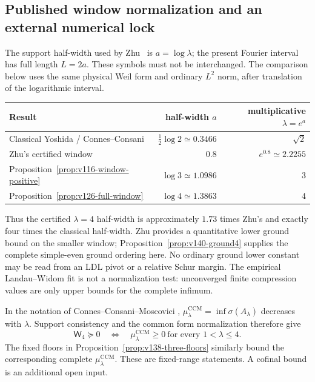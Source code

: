 \subsection*{Published window normalization and an external numerical lock}

The support half-width used by Zhu~\cite{Zhu2026Windows} is
$a=\log\lambda$; the present Fourier interval has full length
$L=2a$. These symbols must not be interchanged. The comparison below
uses the same physical Weil form and ordinary $L^2$ norm, after
translation of the logarithmic interval.
\begin{center}
\begin{tabular}{lrr}
\toprule
Result & half-width $a$ & multiplicative $\lambda=e^a$\\
\midrule
Classical Yoshida / Connes--Consani & $\tfrac12\log2\simeq0.3466$ & $\sqrt2$\\
Zhu's certified window & $0.8$ & $e^{0.8}\simeq2.2255$\\
Proposition~\ref{prop:v116-window-positive} & $\log3\simeq1.0986$ & $3$\\
Proposition~\ref{prop:v126-full-window} & $\log4\simeq1.3863$ & $4$\\
\bottomrule
\end{tabular}
\end{center}
Thus the certified $\lambda=4$ half-width is approximately $1.73$
times Zhu's and exactly four times the classical half-width. Zhu
provides a quantitative lower ground bound on the smaller window;
Proposition~\ref{prop:v140-ground4} supplies the complete simple-even
ground ordering here. No ordinary ground lower constant may be read
from an LDL pivot or a relative Schur margin. The empirical
Landau--Widom fit is not a normalization test: unconverged finite
compression values are only upper bounds for the complete infimum.

In the notation of Connes--Consani--Moscovici
\cite[Corollaries 3.7--3.8]{ConnesConsaniMoscovici2025},
$\mu^{\mathrm{CCM}}_\lambda=\inf\sigma(A_\lambda)$ decreases with $\lambda$.
Support consistency and the common form normalization therefore give
\[
 \mathsf W_4\succeq0\quad\Longleftrightarrow\quad
 \mu^{\mathrm{CCM}}_\lambda\ge0\ \text{for every }1<\lambda\le4.
\]
The fixed floors in Proposition~\ref{prop:v138-three-floors} similarly
bound the corresponding complete $\mu^{\mathrm{CCM}}_\lambda$. These are fixed-range
statements. A cofinal bound is an additional open input.

